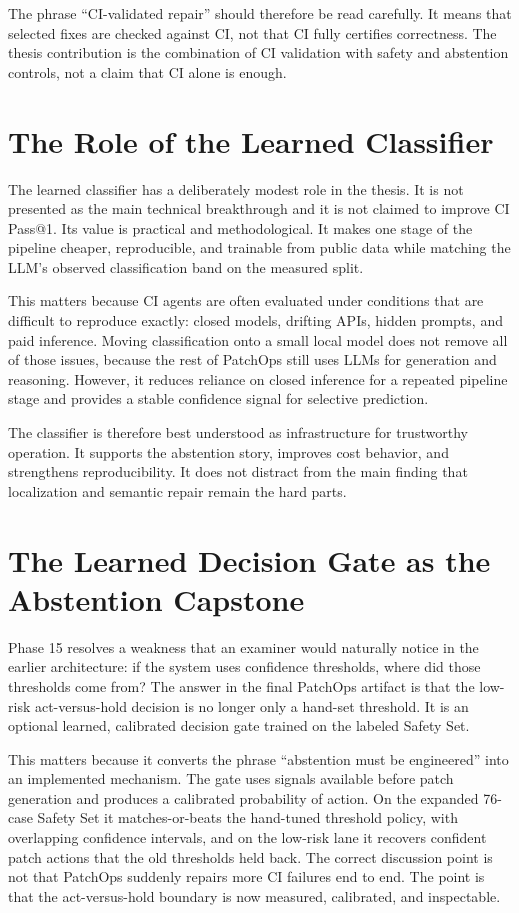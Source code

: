 The phrase ``CI-validated repair'' should therefore be read carefully. It means that selected fixes are checked
against CI, not that CI fully certifies correctness. The thesis contribution is the combination of CI validation
with safety and abstention controls, not a claim that CI alone is enough.

\section{The Role of the Learned Classifier}

The learned classifier has a deliberately modest role in the thesis. It is not presented as the main technical
breakthrough and it is not claimed to improve CI Pass@1. Its value is practical and methodological. It makes one
stage of the pipeline cheaper, reproducible, and trainable from public data while matching the LLM's observed
classification band on the measured split.

This matters because CI agents are often evaluated under conditions that are difficult to reproduce exactly:
closed models, drifting APIs, hidden prompts, and paid inference. Moving classification onto a small local model
does not remove all of those issues, because the rest of PatchOps still uses LLMs for generation and reasoning.
However, it reduces reliance on closed inference for a repeated pipeline stage and provides a stable confidence
signal for selective prediction.

The classifier is therefore best understood as infrastructure for trustworthy operation. It supports the
abstention story, improves cost behavior, and strengthens reproducibility. It does not distract from the main
finding that localization and semantic repair remain the hard parts.

\section{The Learned Decision Gate as the Abstention Capstone}

Phase 15 resolves a weakness that an examiner would naturally notice in the earlier architecture: if the system
uses confidence thresholds, where did those thresholds come from? The answer in the final PatchOps artifact is
that the low-risk act-versus-hold decision is no longer only a hand-set threshold. It is an optional learned,
calibrated decision gate trained on the labeled Safety Set.

This matters because it converts the phrase ``abstention must be engineered'' into an implemented mechanism. The
gate uses signals available before patch generation and produces a calibrated probability of action. On the
expanded 76-case Safety Set it matches-or-beats the hand-tuned threshold policy, with overlapping confidence
intervals, and on the low-risk lane it recovers confident patch actions that the old thresholds held back. The
correct discussion point is not that PatchOps suddenly repairs more CI failures end to end. The point is that the
act-versus-hold boundary is now measured, calibrated, and inspectable.

